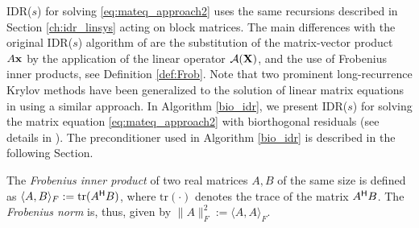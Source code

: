 IDR($s$) for solving \eqref{eq:mateq_approach2} uses the same recursions described in Section \ref{ch:idr_linsys} acting on block matrices. The main differences with the original IDR($s$) algorithm of \cite{sg08} are the substitution of the matrix-vector product $A {\mathbf{x}}$ 
by the application of the linear operator ${\mathcal{A}}({\mathbf{X}})$, and the use of Frobenius 
inner products, see Definition \ref{def:Frob}. Note that two prominent long-recurrence Krylov methods have been generalized to the solution of linear matrix equations in \cite{JMS99} using a similar approach. In Algorithm \ref{bio_idr}, we present IDR($s$) for solving the matrix 
equation \eqref{eq:mateq_approach2} with bi\-orth\-o\-gonal residuals (see details in \cite{ag15,gs11}). The preconditioner used in Algorithm \ref{bio_idr} is described in the following Section. 


\begin{definition}
\label{def:Frob}
 The \textit{Frobenius inner product} of two real matrices $A, B$ of the same size is defined as $\langle A, B \rangle_F := \text{tr}(A^{\mathsf{H}} B)$, where $\text{tr}(\cdot)$ denotes the trace of the matrix $A^{\mathsf{H}} B$. The \textit{Frobenius norm} is, thus,  given by $\|A\|_F^2 := \langle A , A \rangle_F$.
\end{definition}

